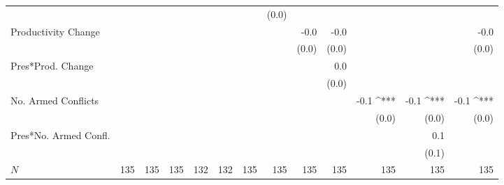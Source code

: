 \documentclass[a4paper]{article}\usepackage[]{graphicx}\usepackage[]{color}
\begin{document}
\begin{table}[ht]
\begin{center}
{{\begin{tabular}{ l D{.}{.}{1}D{.}{.}{1}D{.}{.}{1}D{.}{.}{1}D{.}{.}{1}D{.}{.}{1}D{.}{.}{1}D{.}{.}{1}D{.}{.}{1}D{.}{.}{1}D{.}{.}{1}D{.}{.}{1} }
                      &                 &                 &                 &                 &                 &                 & (0.0)           &                 &                 &                 &                 &                \\ 
Productivity Change   &                 &                 &                 &                 &                 &                 &                 & -0.0            & -0.0            &                 &                 & -0.0           \\ 
                      &                 &                 &                 &                 &                 &                 &                 & (0.0)           & (0.0)           &                 &                 & (0.0)          \\ 
Pres*Prod. Change     &                 &                 &                 &                 &                 &                 &                 &                 & 0.0             &                 &                 &                \\ 
                      &                 &                 &                 &                 &                 &                 &                 &                 & (0.0)           &                 &                 &                \\ 
No. Armed Conflicts   &                 &                 &                 &                 &                 &                 &                 &                 &                 & -0.1 ^{***}     & -0.1 ^{***}     & -0.1 ^{***}    \\ 
                      &                 &                 &                 &                 &                 &                 &                 &                 &                 & (0.0)           & (0.0)           & (0.0)          \\ 
Pres*No. Armed Confl. &                 &                 &                 &                 &                 &                 &                 &                 &                 &                 & 0.1             &                \\ 
                      &                 &                 &                 &                 &                 &                 &                 &                 &                 &                 & (0.1)           &                 \\
 $N$                   & 135             & 135             & 135             & 132             & 132             & 135             & 135             & 135             & 135             & 135             & 135             & 135            \\ 

\end{tabular}}}
\end{center}
\end{table}
\end{document}
